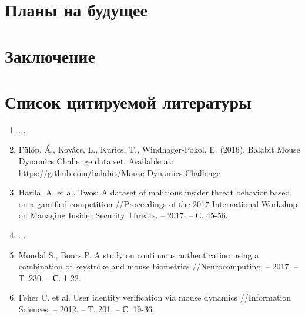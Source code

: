 \documentclass[12pt]{article}
\begin{document}
    \newpage



    \section{Планы на будущее}
    \label{sec:Future}

    \newpage



    \section{Заключение}
    \label{sec:Conclusion}

    \newpage



    \section{Список цитируемой литературы}
    \label{sec:ListOfReferences}
    \begin{enumerate}
        \item ...
        \item Fülöp, Á., Kovács, L., Kurics, T., Windhager-Pokol, E. (2016). Balabit Mouse Dynamics Challenge data set. Available at: https://github.com/balabit/Mouse-Dynamics-Challenge
        \item Harilal A. et al. Twos: A dataset of malicious insider threat behavior based on a gamified competition //Proceedings of the 2017 International Workshop on Managing Insider Security Threats. – 2017. – С. 45-56.
        \item ...
        \item Mondal S., Bours P. A study on continuous authentication using a combination of keystroke and mouse biometrics //Neurocomputing. – 2017. – Т. 230. – С. 1-22.
        \item Feher C. et al. User identity verification via mouse dynamics //Information Sciences. – 2012. – Т. 201. – С. 19-36.
    \end{enumerate}

    \newpage
\end{document}
